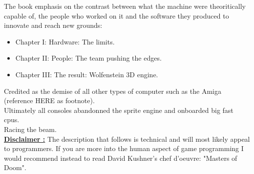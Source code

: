 The book emphasis on the contrast between what the machine were theoritically capable of, the people who worked on it and the software they produced to innovate and reach new grounds:
\begin{itemize}
\item Chapter I: Hardware: The limits.
\item Chapter II: People: The team pushing the edges.
\item Chapter III: The result: Wolfenstein 3D engine.
\end{itemize}
Credited as the demise of all other types of computer such as the Amiga (reference HERE as footnote).\\
Ultimately all consoles abandonned the sprite engine and onboarded big fast cpus.\\
Racing the beam.\\
 \textbf{\underline{Disclaimer :}} The description that follows is technical and will most likely appeal to programmers. If you are more into the human aspect of game programming I would recommend instead to read David Kushner's chef d'oeuvre: "Masters of Doom".
